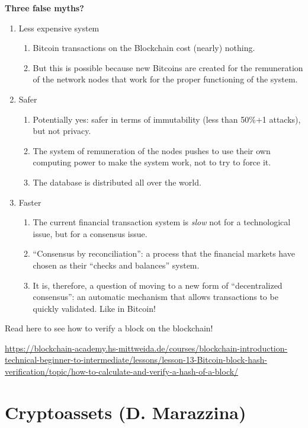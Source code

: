 \textbf{Three false myths?}
\begin{enumerate}
    \item Less expensive system
        \begin{enumerate}
            \item Bitcoin transactions on the Blockchain cost (nearly) nothing.
            \item But this is possible because new Bitcoins are created for the remuneration of the network nodes that work for the proper functioning of the system.
        \end{enumerate}
    \item Safer
        \begin{enumerate}
            \item Potentially yes: safer in terms of immutability (less than 50\%+1 attacks), but not privacy.
            \item The system of remuneration of the nodes pushes to use their own computing power to make the system work, not to try to force it.
            \item The database is distributed all over the world.
        \end{enumerate}
    \item Faster
        \begin{enumerate}
            \item The current financial transaction system is \textit{slow} not for a technological issue, but for a consensus issue.
            \item ``Consensus by reconciliation'': a process that the financial markets have chosen as their ``checks and balances'' system.
            \item It is, therefore, a question of moving to a new form of ``decentralized consensus'': an automatic mechanism that allows transactions to be quickly validated. Like in Bitcoin!
        \end{enumerate}
\end{enumerate}

Read here to see how to verify a block on the blockchain!

{\scriptsize\url{https://blockchain-academy.hs-mittweida.de/courses/blockchain-introduction-technical-beginner-to-intermediate/lessons/lesson-13-Bitcoin-block-hash-verification/topic/how-to-calculate-and-verify-a-hash-of-a-block/}}

\section{Cryptoassets (D. Marazzina)}


